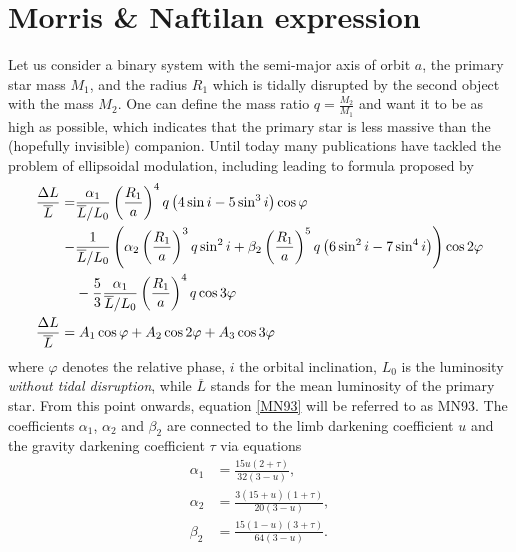\documentclass{pracalicmgr}
\begin{document}
\section{Morris \& Naftilan expression}
Let us consider a binary system with the semi-major axis of orbit $a$, the primary star mass $M_1$, and the radius $R_1$ which is tidally disrupted by the second object with the mass $M_2$.
One can define the mass ratio $q=\frac{M_2}{M_1}$ and want it to be as high as possible, which indicates that the primary star
is less massive than the (hopefully invisible) companion. 
Until today many publications have tackled the problem of ellipsoidal modulation, including \citet{kopal_close_1959} leading to formula proposed by \citet{morris_equations_1993}
\begin{align}\label{MN93}
    \begin{split}
    \phantom{\frac{\Delta{L}}{\overline{L}}}
    &\begin{aligned}
        \mathllap{\frac{\Delta{L}}{\overline{L}}}  =& \frac{\alpha_1}{\overline{L}/L_0}\left(\frac{R_1}{a}\right)^4q\left(4\sin{i}-5\sin^3{i}\right)\cos{\varphi} \\
        -&\frac{1}{\overline{L}/L_0}\left(\alpha_2\left(\frac{R_1}{a}\right)^3q\sin^2{i}+\beta_2 
        \left(\frac{R_1}{a}\right)^5q\left(6\sin^2{i}-7\sin^4{i}\right)\right)\cos{2\varphi} \\
        &-\frac{5}{3}\frac{\alpha_1}{\overline{L}/L_0}\left(\frac{R_1}{a}\right)^4q\cos{3\varphi}
    \end{aligned}\\
    &\begin{aligned}
        \mathllap{\frac{\Delta{L}}{\overline{L}}}   &= A_1\cos{\varphi}+A_2\cos{2\varphi}+A_3\cos{3\varphi}
    \end{aligned}
    \end{split}
\end{align}
where $\varphi$ denotes the relative phase, $i$ the orbital inclination, $L_0$ is the luminosity {{\it without tidal disruption}},
while $\overline{L}$ stands for the mean luminosity of the primary star. From this point onwards, equation \ref{MN93} will be referred to as MN93.
The coefficients $\alpha_1$, $\alpha_2$ and
$\beta_2$ are connected to the limb darkening coefficient $u$ and the gravity darkening coefficient $\tau$ via equations
\begin{align}
    \alpha_1 &=\frac{15u(2+\tau)}{32(3-u)},\\
    \alpha_2 &=\frac{3(15+u)(1+\tau)}{20(3-u)},\\
    \beta_2 &=\frac{15(1-u)(3+\tau)}{64(3-u)}.
\end{align}
\end{document}
